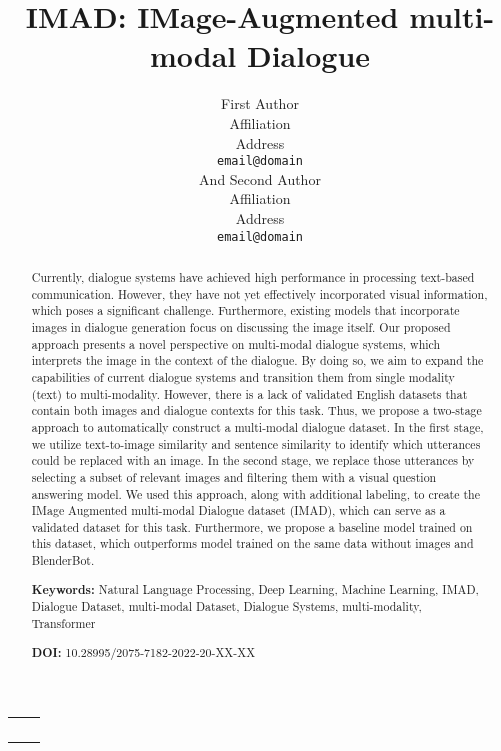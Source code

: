 \documentclass[11pt]{article}
\title{IMAD: IMage-Augmented multi-modal Dialogue}
\author{First Author \\
  Affiliation \\
  Address \\
  {\tt email@domain} \\And
  Second Author \\
  Affiliation \\
  Address \\
  {\tt email@domain \\}}
\date{}
\begin{document}
\maketitle
\begin{abstract}
  Currently, dialogue systems have achieved high performance in processing text-based communication. However, they have not yet effectively incorporated visual information, which poses a significant challenge. Furthermore, existing models that incorporate images in dialogue generation focus on discussing the image itself. Our proposed approach presents a novel perspective on multi-modal dialogue systems, which interprets the image in the context of the dialogue. By doing so, we aim to expand the capabilities of current dialogue systems and transition them from single modality (text) to multi-modality. However, there is a lack of validated English datasets that contain both images and dialogue contexts for this task. Thus, we propose a two-stage approach to automatically construct a multi-modal dialogue dataset. In the first stage, we utilize text-to-image similarity and sentence similarity to identify which utterances could be replaced with an image. In the second stage, we replace those utterances by selecting a subset of relevant images and filtering them with a visual question answering model. We used this approach, along with additional labeling, to create the IMage Augmented multi-modal Dialogue dataset (IMAD), which can serve as a validated dataset for this task. Furthermore, we propose a baseline model trained on this dataset, which outperforms model trained on the same data without images and BlenderBot.
  
  \textbf{Keywords:} Natural Language Processing, Deep Learning, Machine Learning, IMAD, Dialogue Dataset, multi-modal Dataset, Dialogue Systems, multi-modality, Transformer
  
  \textbf{DOI:} 10.28995/2075-7182-2022-20-XX-XX
\end{abstract}

\begin{center}

  \medskip \setlength\tabcolsep{2cm}
  \begin{tabular}{cc}
    \textbf{} & \textbf{}\\
       & \\
       &  \\
      {\tt } &  {\tt }
  \end{tabular}
  \medskip
\end{center}
\end{document}
